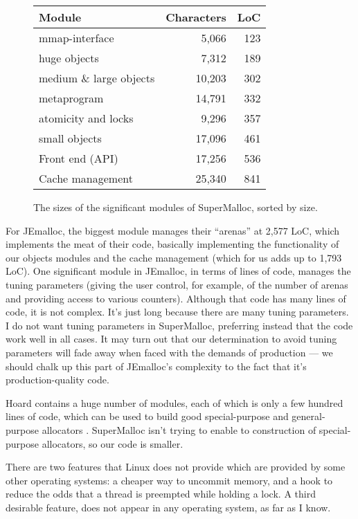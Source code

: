 \documentclass[natbib,sort&compress,10pt]{sigplanconf}
\begin{document}
\begin{figure}
\begin{center}
\begin{tabular}{lrr}
Module & Characters & LoC \\ \hline
mmap-interface         &   5,066 &  123 \\        
huge objects           &   7,312 &  189 \\
medium \& large objects&  10,203 &  302 \\
metaprogram            &  14,791 &  332 \\
atomicity and locks    &   9,296 &  357 \\
small objects          &  17,096 &  461 \\
Front end (API)        &  17,256 &  536 \\
Cache management       &  25,340 &  841 \\
\end{tabular}
\end{center}
\caption{The sizes of the significant modules of SuperMalloc, sorted by size.}
\label{fig:supermodules}
\end{figure}

For JEmalloc, the biggest module manages their ``arenas'' at 2,577
LoC, which implements the meat of their code, basically implementing
the functionality of our objects modules and the cache management
(which for us adds up to 1,793 LoC).  One significant module in
JEmalloc, in terms of lines of code, manages the tuning parameters
(giving the user control, for example, of the number of arenas and
providing access to various counters).  Although that code has many
lines of code, it is not complex.  It's just long because there are
many tuning parameters.  I do not want tuning parameters in
SuperMalloc, preferring instead that the code work well in all cases.
It may turn out that our determination to avoid tuning parameters will
fade away when faced with the demands of production --- we should
chalk up this part of JEmalloc's complexity to the fact that it's
production-quality code.

Hoard contains a huge number of modules, each of which is only a few
hundred lines of code, which can be used to build good special-purpose
and general-purpose allocators \cite{AlexandrescuBe05}.  SuperMalloc
isn't trying to enable to construction of special-purpose allocators,
so our code is smaller.


There are two features that Linux does not provide which are provided
by some other operating systems: a cheaper way to uncommit memory, and
a hook to reduce the odds that a thread is preempted while holding a
lock.  A third desirable feature,  does not
appear in any operating system, as far as I know.
\end{document}
